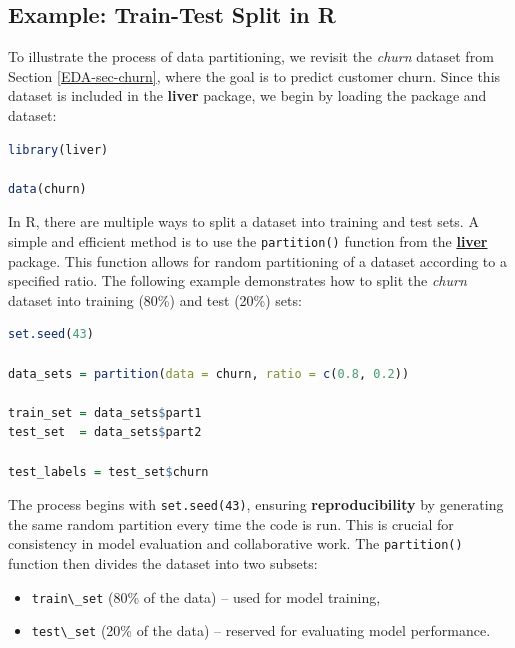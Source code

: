 \documentclass[
  11pt,
]{book}
\newcommand{\passthrough}[1]{#1}
\providecommand{\tightlist}{%
  \setlength{\itemsep}{0pt}\setlength{\parskip}{0pt}}
\theoremstyle{definition}
\theoremstyle{definition}
\theoremstyle{definition}
\theoremstyle{definition}
\theoremstyle{remark}
\begin{document}
\subsection*{Example: Train-Test Split in R}\label{example-train-test-split-in-r}


To illustrate the process of data partitioning, we revisit the \emph{churn} dataset from Section \ref{EDA-sec-churn}, where the goal is to predict customer churn. Since this dataset is included in the \textbf{liver} package, we begin by loading the package and dataset:

\begin{lstlisting}[language=R]
library(liver)

data(churn) 
\end{lstlisting}

In R, there are multiple ways to split a dataset into training and test sets. A simple and efficient method is to use the \passthrough{\lstinline!partition()!} function from the \href{https://CRAN.R-project.org/package=liver}{\textbf{liver}} package. This function allows for random partitioning of a dataset according to a specified ratio. The following example demonstrates how to split the \emph{churn} dataset into training (80\%) and test (20\%) sets:

\begin{lstlisting}[language=R]
set.seed(43)

data_sets = partition(data = churn, ratio = c(0.8, 0.2))

train_set = data_sets$part1
test_set  = data_sets$part2

test_labels = test_set$churn
\end{lstlisting}

The process begins with \passthrough{\lstinline!set.seed(43)!}, ensuring \textbf{reproducibility} by generating the same random partition every time the code is run. This is crucial for consistency in model evaluation and collaborative work. The \passthrough{\lstinline!partition()!} function then divides the dataset into two subsets:

\begin{itemize}
\tightlist
\item
  \passthrough{\lstinline!train\_set!} (80\% of the data) -- used for model training,\\
\item
  \passthrough{\lstinline!test\_set!} (20\% of the data) -- reserved for evaluating model performance.
\end{itemize}
\end{document}
